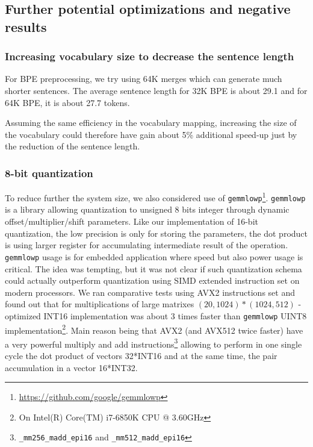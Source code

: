 \documentclass[11pt,a4paper]{article}
\begin{document}
\subsection{Further potential optimizations and negative results}

\subsubsection{Increasing vocabulary size to decrease the sentence length}
For BPE preprocessing, we try using 64K merges which can generate much shorter sentences.
The average sentence length for 32K BPE is about 29.1 and for 64K BPE, it is about 27.7 tokens.

Assuming the same efficiency in the vocabulary mapping, increasing the size of the vocabulary could therefore have gain about 5\% additional speed-up just by the reduction of the sentence length.

\subsubsection{8-bit quantization}

To reduce further the system size, we also considered use of {\tt gemmlowp}\footnote{\url{https://github.com/google/gemmlowp}}. {\tt gemmlowp} is a library allowing quantization to unsigned 8 bits integer through dynamic offset/multiplier/shift parameters. Like our implementation of 16-bit quantization, the low precision is only for storing the parameters, the dot product is using larger register for accumulating intermediate result of the operation. {\tt gemmlowp} usage is for embedded application where speed but also power usage is critical. The idea was tempting, but it was not clear if such quantization schema could actually outperform quantization using SIMD extended instruction set on modern processors. We ran  comparative tests using AVX2 instructions set and found out that for multiplications of large matrixes $(20,1024) * (1024,512)$ - optimized INT16 implementation was about 3 times faster than  {\tt gemmlowp} UINT8 implementation\footnote{On Intel(R) Core(TM) i7-6850K CPU @ 3.60GHz}. Main reason being that AVX2 (and AVX512 twice faster) have a very powerful multiply and add instructions\footnote{{\tt \_mm256\_madd\_epi16} and {\tt \_mm512\_madd\_epi16}} allowing to perform in one single cycle the dot product of vectors 32*INT16 and at the same time, the pair accumulation in a vector 16*INT32.

\end{document}
